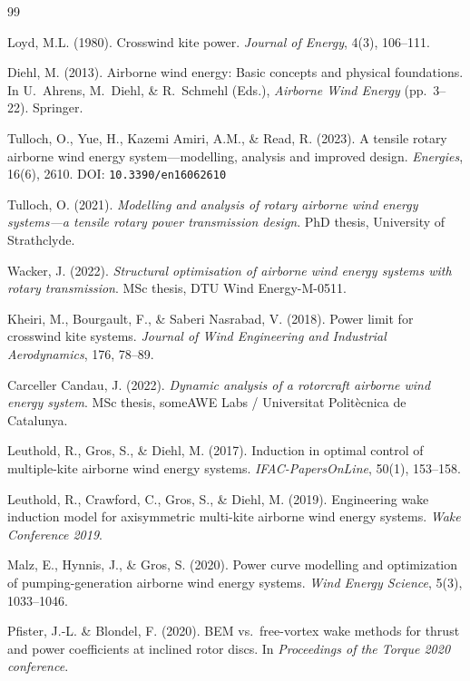\documentclass[11pt,a4paper]{article}
\newcommand{\doi}[1]{DOI: \texttt{#1}}
\begin{document}
\begin{thebibliography}{99}

Loyd, M.L. (1980).
Crosswind kite power.
\emph{Journal of Energy}, 4(3), 106--111.

Diehl, M. (2013).
Airborne wind energy: Basic concepts and physical foundations.
In U.~Ahrens, M.~Diehl, \& R.~Schmehl (Eds.),
\emph{Airborne Wind Energy} (pp.~3--22). Springer.

Tulloch, O., Yue, H., Kazemi Amiri, A.M., \& Read, R. (2023).
A tensile rotary airborne wind energy system---modelling, analysis and improved design.
\emph{Energies}, 16(6), 2610.
\doi{10.3390/en16062610}

Tulloch, O. (2021).
\emph{Modelling and analysis of rotary airborne wind energy systems---a tensile rotary power transmission design}.
PhD thesis, University of Strathclyde.

Wacker, J. (2022).
\emph{Structural optimisation of airborne wind energy systems with rotary transmission}.
MSc thesis, DTU Wind Energy-M-0511.

Kheiri, M., Bourgault, F., \& Saberi Nasrabad, V. (2018).
Power limit for crosswind kite systems.
\emph{Journal of Wind Engineering and Industrial Aerodynamics}, 176, 78--89.

Carceller Candau, J. (2022).
\emph{Dynamic analysis of a rotorcraft airborne wind energy system}.
MSc thesis, someAWE Labs / Universitat Polit\`ecnica de Catalunya.

Leuthold, R., Gros, S., \& Diehl, M. (2017).
Induction in optimal control of multiple-kite airborne wind energy systems.
\emph{IFAC-PapersOnLine}, 50(1), 153--158.

Leuthold, R., Crawford, C., Gros, S., \& Diehl, M. (2019).
Engineering wake induction model for axisymmetric multi-kite airborne wind energy systems.
\emph{Wake Conference 2019}.

Malz, E., Hynnis, J., \& Gros, S. (2020).
Power curve modelling and optimization of pumping-generation airborne wind energy systems.
\emph{Wind Energy Science}, 5(3), 1033--1046.

Pfister, J.-L. \& Blondel, F. (2020).
BEM vs.\ free-vortex wake methods for thrust and power coefficients at inclined rotor discs.
In \emph{Proceedings of the Torque 2020 conference}.


\end{thebibliography}
\end{document}
